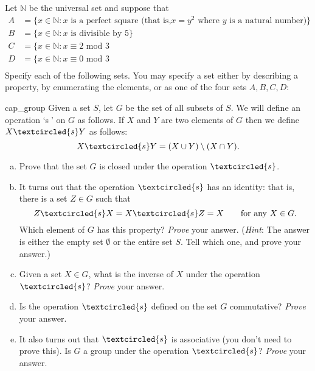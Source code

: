 

\begin{exercise}{20}
Let ${\mathbb N}$ be the universal set and suppose that
\begin{align*}
A &= \{ x \in {\mathbb N} : x \text{ is a perfect square (that is,} x=y^2 \text{ where } y \text{ is a natural number)}\} \\ 
B &= \{ x \in {\mathbb N} : x \text{ is divisible by 5}\} \\ 
C &= \{ x \in {\mathbb N} : x  \equiv 2 \text{ mod 3} \\
D &= \{ x \in {\mathbb N} : x  \equiv 0 \text{ mod 3} \\
\end{align*} 
Specify each of the following sets. You may specify a set either by describing a property, by enumerating the elements, or as one of the four sets $A, B, C, D$:
\begin{enumerate}[(a)]
\item
$(A \cap B)$
\item
$B \cap C$
\item
$B \setminus {C \cup D)$.
\end{enumerate}
\end{exercise}

\begin{exercise}{cap_group}
Given a set $S$, let $G$ be the set of all subsets of $S$. We will define an operation `\textcircled{s}' on $G$ as follows.  If $X$ and $Y$ are two elements of $G$  then we define $X \textcircled{s} Y$ as follows:
\[ X \textcircled{s} Y = (X \cup Y) \setminus (X \cap Y) .\]
\begin{enumerate}[(a)]
\item
Prove that the set $G$ is closed under the operation $\textcircled{s}$.
\item
It turns out that the operation $\textcircled{s}$ has an identity: that is, there is a set $Z \in G$ such that
\[  Z \textcircled{s} X = X \textcircled{s} Z = X  \qquad \text{for any $X \in G$.} \]
Which element of $G$ has this property?  \emph{Prove} your answer.  (\emph{Hint}:  The answer is either the empty set $\emptyset$ or the entire set $S$. Tell which one, and prove your answer.)  
\item
Given a set $X \in G$, what is the inverse of $X$ under the operation $\textcircled{s}$?  \emph{Prove} your answer. 
\item
Is the operation $\textcircled{s}$ defined on the set $G$ commutative? \emph{Prove} your answer. 
\item
It also turns out that $\textcircled{s}$ is associative (you don't need to prove this).  Is $G$ a group under the operation $\textcircled{s}$?  \emph{Prove} your answer.
\end{enumerate}
\end{exercise} 


